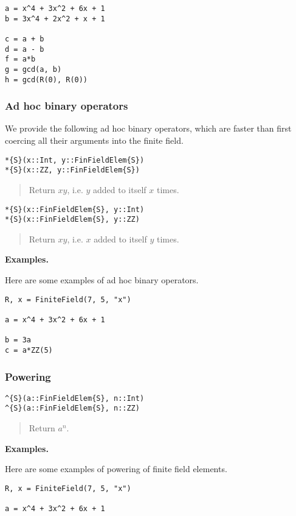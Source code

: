 \documentclass[a4paper,10pt]{article}
\newcommand{\desc}[1]{\vspace{-3mm}\begin{quote}#1\end{quote}}
\begin{document}
{{{\begin{lstlisting}
a = x^4 + 3x^2 + 6x + 1
b = 3x^4 + 2x^2 + x + 1

c = a + b
d = a - b
f = a*b
g = gcd(a, b)
h = gcd(R(0), R(0))
\end{lstlisting}

\subsubsection{Ad hoc binary operators}

We provide the following ad hoc binary operators, which are faster than first
coercing all their arguments into the finite field.

\begin{lstlisting}
*{S}(x::Int, y::FinFieldElem{S})
*{S}(x::ZZ, y::FinFieldElem{S})
\end{lstlisting}

\desc{Return $xy$, i.e. $y$ added to itself $x$ times.}

\begin{lstlisting}
*{S}(x::FinFieldElem{S}, y::Int)
*{S}(x::FinFieldElem{S}, y::ZZ)
\end{lstlisting}

\desc{Return $xy$, i.e. $x$ added to itself $y$ times.}

\textbf{Examples.}

Here are some examples of ad hoc binary operators.

\begin{lstlisting}
R, x = FiniteField(7, 5, "x")

a = x^4 + 3x^2 + 6x + 1

b = 3a
c = a*ZZ(5)
\end{lstlisting}

\subsubsection{Powering}

\begin{lstlisting}
^{S}(a::FinFieldElem{S}, n::Int)
^{S}(a::FinFieldElem{S}, n::ZZ)
\end{lstlisting}

\desc{Return $a^n$.}

\textbf{Examples.}

Here are some examples of powering of finite field elements.

\begin{lstlisting}
R, x = FiniteField(7, 5, "x")

a = x^4 + 3x^2 + 6x + 1


\end{lstlisting}}}}
\end{document}
